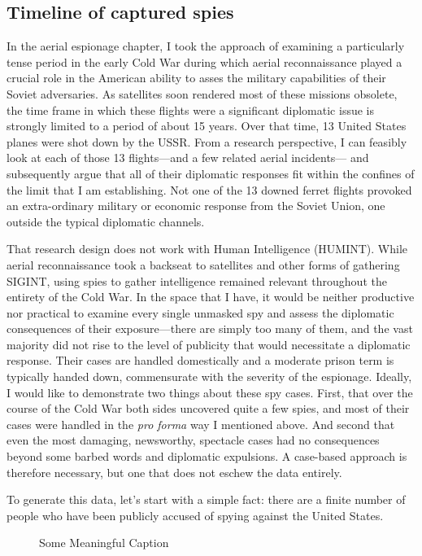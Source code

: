 \documentclass[12pt]{article}
\begin{document}
\subsection{Timeline of captured spies}
In the aerial espionage chapter, I took the approach of examining a particularly tense period in the early Cold War during which aerial reconnaissance played a crucial role in the American ability to asses the military capabilities of their Soviet adversaries. As satellites soon rendered most of these missions obsolete, the time frame in which these flights were a significant diplomatic issue is strongly limited to a period of about 15 years. Over that time, 13 United States planes were shot down by the USSR. From a research perspective, I can feasibly look at each of those 13 flights---and a few related aerial incidents--- and subsequently argue that all of their diplomatic responses fit within the confines of the limit that I am establishing. Not one of the 13 downed ferret flights provoked an extra-ordinary military or economic response from the Soviet Union, one outside the typical diplomatic channels.

That research design does not work with Human Intelligence (HUMINT). While aerial reconnaissance took a backseat to satellites and other forms of gathering SIGINT, using spies to gather intelligence remained relevant throughout the entirety of the Cold War. In the space that I have, it would be neither productive nor practical to examine every single unmasked spy and assess the diplomatic consequences of their exposure---there are simply too many of them, and the vast majority did not rise to the level of publicity that would necessitate a diplomatic response. Their cases are handled domestically and a moderate prison term is typically handed down, commensurate with the severity of the espionage. Ideally, I would like to demonstrate two things about these spy cases. First, that over the course of the Cold War both sides uncovered quite a few spies, and most of their cases were handled in the \emph{pro forma} way I mentioned above. And second that even the most damaging, newsworthy, spectacle cases had no consequences beyond some barbed words and diplomatic expulsions. A case-based approach is therefore necessary, but one that does not eschew the data entirely.

To generate this data, let's start with a simple fact: there are a finite number of people who have been publicly accused of spying against the United States.

\begin{figure}[ht]
  \centering
  
  \caption{Some Meaningful Caption}
\end{figure}
\end{document}
